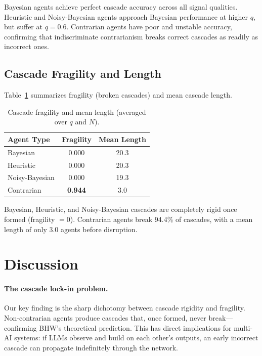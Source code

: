 \documentclass[11pt]{article}
\begin{document}
Bayesian agents achieve perfect cascade accuracy across all signal qualities.
Heuristic and Noisy-Bayesian agents approach Bayesian performance at higher $q$, but suffer at $q{=}0.6$.
Contrarian agents have poor and unstable accuracy, confirming that indiscriminate contrarianism breaks correct cascades as readily as incorrect ones.

\subsection{Cascade Fragility and Length}

Table~\ref{tab:fragility} summarizes fragility (broken cascades) and mean cascade length.

\begin{table}[h]
\centering
\caption{Cascade fragility and mean length (averaged over $q$ and $N$).}
\label{tab:fragility}
\begin{tabular}{lcc}
\toprule
\textbf{Agent Type} & \textbf{Fragility} & \textbf{Mean Length} \\
\midrule
Bayesian        & 0.000 & 20.3 \\
Heuristic       & 0.000 & 20.3 \\
Noisy-Bayesian  & 0.000 & 19.3 \\
Contrarian      & \textbf{0.944} & 3.0 \\
\bottomrule
\end{tabular}
\end{table}

Bayesian, Heuristic, and Noisy-Bayesian cascades are completely rigid once formed (fragility $= 0$).
Contrarian agents break 94.4\% of cascades, with a mean length of only 3.0 agents before disruption.

\section{Discussion}

\paragraph{The cascade lock-in problem.}
Our key finding is the sharp dichotomy between cascade rigidity and fragility.
Non-contrarian agents produce cascades that, once formed, never break---confirming BHW's theoretical prediction.
This has direct implications for multi-AI systems: if LLMs observe and build on each other's outputs, an early incorrect cascade can propagate indefinitely through the network.
\end{document}
